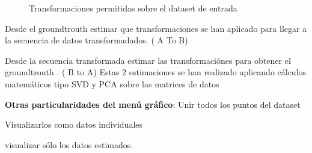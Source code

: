 \begin{figure}
\begin{center}
\hspace{0.5cm}
\end{center}
\caption{Transformaciones permitidas sobre el dataset de entrada }
\end{figure}
	Desde el groundtrouth estimar que transformaciones se han aplicado para llegar a la secuencia de datos transformadados. ( A To B)

	Desde la secuencia transformada estimar las transformaciónes para obtener el groundtrouth . ( B to A)
Estas 2 estimaciones se han realizado aplicando cálculos matemáticos tipo SVD y PCA sobre las matrices de datos

\textbf{Otras particularidades del menú gráfico}:
	Unir todos los puntos del dataset 
    
    Visualizarlos como datos individuales

	visualizar sólo los datos estimados.


